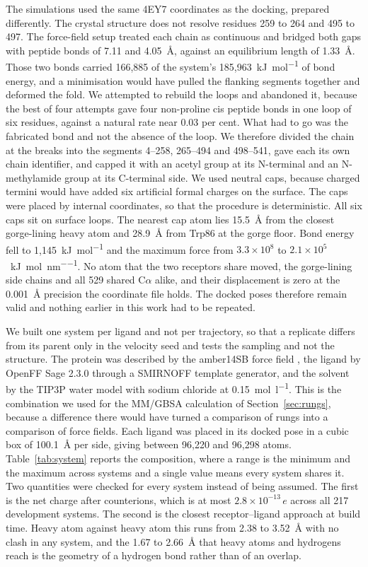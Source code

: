 The simulations used the same 4EY7 coordinates as the docking, prepared differently.
The crystal structure does not resolve residues 259 to 264 and 495 to 497. The
force-field setup treated each chain as continuous and bridged both gaps with peptide
bonds of 7.11 and \SI{4.05}{\angstrom}, against an equilibrium length of
\SI{1.33}{\angstrom}. Those two bonds carried 166{,}885 of the system's
185{,}963~\si{\kilo\joule\per\mole} of bond energy, and a minimisation would have
pulled the flanking segments together and deformed the fold. We attempted to rebuild
the loops and abandoned it, because the best of four attempts gave four non-proline cis
peptide bonds in one loop of six residues, against a natural rate near 0.03 per cent.
What had to go was the fabricated bond and not the absence of the loop. We therefore
divided the chain at the breaks into the segments 4--258, 265--494 and 498--541, gave
each its own chain identifier, and capped it with an acetyl group at its N-terminal and
an N-methylamide group at its C-terminal side. We used neutral caps, because charged
termini would have added six artificial formal charges on the surface. The caps were
placed by internal coordinates, so that the procedure is deterministic. All six caps
sit on surface loops. The nearest cap atom lies \SI{15.5}{\angstrom} from the closest
gorge-lining heavy atom and \SI{28.9}{\angstrom} from Trp86 at the gorge floor. Bond
energy fell to 1{,}145~\si{\kilo\joule\per\mole} and the maximum force from
$3.3\times10^{8}$ to $2.1\times10^{5}$~\si{\kilo\joule\per\mole\per\nano\metre}. No
atom that the two receptors share moved, the gorge-lining side chains and all 529
shared C$\alpha$ alike, and their displacement is zero at the \SI{0.001}{\angstrom}
precision the coordinate file holds. The docked poses therefore remain valid and
nothing earlier in this work had to be repeated.

We built one system per ligand and not per trajectory, so that a replicate differs from
its parent only in the velocity seed and tests the sampling and not the structure. The
protein was described by the amber14SB force field \citep{amber_ff14sb}, the ligand by
OpenFF Sage 2.3.0 \citep{openff_sage} through a SMIRNOFF template generator, and the
solvent by the TIP3P water model \citep{tip3p} with sodium chloride at
\SI{0.15}{\mole\per\litre}. This is the combination we used for the MM/GBSA calculation
of Section~\ref{sec:rungs}, because a difference there would have turned a comparison
of rungs into a comparison of force fields. Each ligand was placed in its docked pose
in a cubic box of \SI{100.1}{\angstrom} per side, giving between 96{,}220 and
96{,}298 atoms. Table~\ref{tab:system} reports the composition, where a range is the
minimum and the maximum across systems and a single value means every system shares it.
Two quantities were checked for every system instead of being assumed. The first is the
net charge after counterions, which is at most $2.8\times10^{-13}\,e$ across all 217
development systems. The second is the closest receptor--ligand approach at build
time. Heavy atom against heavy atom this runs from 2.38 to \SI{3.52}{\angstrom} with no
clash in any system, and the 1.67 to \SI{2.66}{\angstrom} that heavy atoms and
hydrogens reach is the geometry of a hydrogen bond rather than of an overlap.


